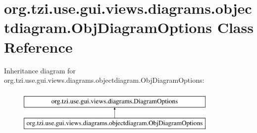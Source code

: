 \hypertarget{classorg_1_1tzi_1_1use_1_1gui_1_1views_1_1diagrams_1_1objectdiagram_1_1_obj_diagram_options}{\section{org.\-tzi.\-use.\-gui.\-views.\-diagrams.\-objectdiagram.\-Obj\-Diagram\-Options Class Reference}
\label{classorg_1_1tzi_1_1use_1_1gui_1_1views_1_1diagrams_1_1objectdiagram_1_1_obj_diagram_options}
}
Inheritance diagram for org.\-tzi.\-use.\-gui.\-views.\-diagrams.\-objectdiagram.\-Obj\-Diagram\-Options\-:\begin{figure}[H]
\begin{center}
\leavevmode
\includegraphics[height=2.000000cm]{classorg_1_1tzi_1_1use_1_1gui_1_1views_1_1diagrams_1_1objectdiagram_1_1_obj_diagram_options}
\end{center}
\end{figure}
